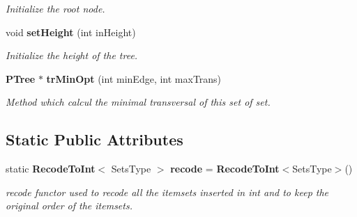\begin{CompactItemize}
\begin{CompactList}\small\item\em Initialize the root node. \item\end{CompactList}\item 
void {\bf set\-Height} (int in\-Height)\label{class_p_tree_823d49f32572e6973cea7f693b28876e}

\begin{CompactList}\small\item\em Initialize the height of the tree. \item\end{CompactList}\item 
{\bf PTree} $\ast$ {\bf tr\-Min\-Opt} (int min\-Edge, int max\-Trans)
\begin{CompactList}\small\item\em Method which calcul the minimal transversal of this set of set. \item\end{CompactList}\end{CompactItemize}
\subsection*{Static Public Attributes}
\begin{CompactItemize}
\item 
static {\bf Recode\-To\-Int}$<$ Sets\-Type $>$ {\bf recode} = {\bf Recode\-To\-Int}$<$Sets\-Type$>$()\label{class_p_tree_a107b599ab3a2a57b350916423ea232e}

\begin{CompactList}\small\item\em recode functor used to recode all the itemsets inserted in int and to keep the original order of the itemsets. \item\end{CompactList}\end{CompactItemize}
